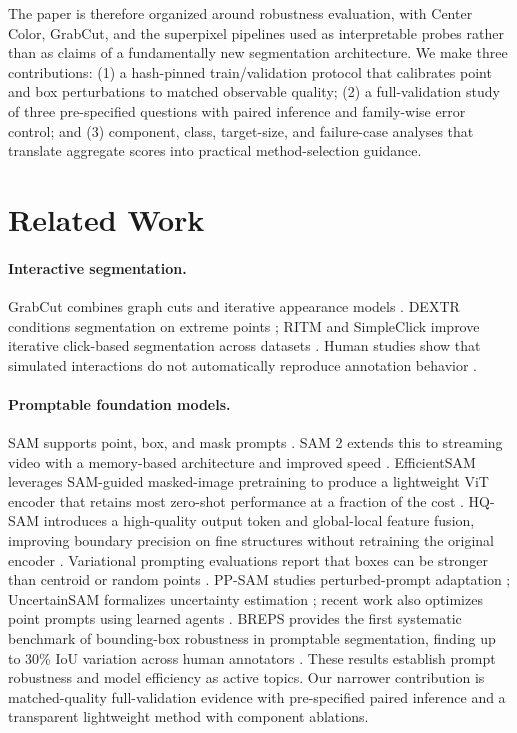 The paper is therefore organized around robustness evaluation, with Center Color, GrabCut, and the superpixel pipelines used as interpretable probes rather than as claims of a fundamentally new segmentation architecture. We make three contributions: (1) a hash-pinned train/validation protocol that calibrates point and box perturbations to matched observable quality; (2) a full-validation study of three pre-specified questions with paired inference and family-wise error control; and (3) component, class, target-size, and failure-case analyses that translate aggregate scores into practical method-selection guidance.

\section{Related Work}

\paragraph{Interactive segmentation.}
GrabCut combines graph cuts and iterative appearance models \cite{grabcut}. DEXTR conditions segmentation on extreme points \cite{dextr}; RITM and SimpleClick improve iterative click-based segmentation across datasets \cite{ritm,simpleclick}. Human studies show that simulated interactions do not automatically reproduce annotation behavior \cite{benenson}.

\paragraph{Promptable foundation models.}
SAM supports point, box, and mask prompts \cite{sam}. SAM 2 extends this to streaming video with a memory-based architecture and improved speed \cite{sam2}. EfficientSAM leverages SAM-guided masked-image pretraining to produce a lightweight ViT encoder that retains most zero-shot performance at a fraction of the cost \cite{efficientsam}. HQ-SAM introduces a high-quality output token and global-local feature fusion, improving boundary precision on fine structures without retraining the original encoder \cite{hqsam}. Variational prompting evaluations report that boxes can be stronger than centroid or random points \cite{gaus}. PP-SAM studies perturbed-prompt adaptation \cite{ppsam}; UncertainSAM formalizes uncertainty estimation \cite{uncertainsam}; recent work also optimizes point prompts using learned agents \cite{attackdefense}. BREPS provides the first systematic benchmark of bounding-box robustness in promptable segmentation, finding up to 30\% IoU variation across human annotators \cite{breps}. These results establish prompt robustness and model efficiency as active topics. Our narrower contribution is matched-quality full-validation evidence with pre-specified paired inference and a transparent lightweight method with component ablations.

